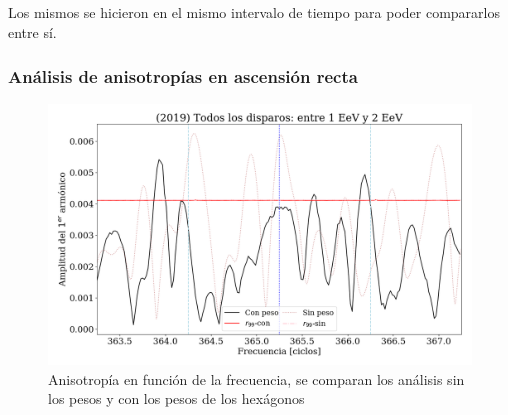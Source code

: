  Los mismos se hicieron en el mismo intervalo de tiempo para poder compararlos entre sí. 
 








	\subsubsection{Análisis de anisotropías en ascensión recta}
		
		\begin{figure}[H]
			\centering
			\includegraphics[width=0.75\linewidth]{pesos_sin_con_1_2_EeV.png}
			\caption{Anisotropía en función de la frecuencia, se comparan los análisis sin los pesos y con los pesos de los hexágonos}
		\end{figure}
		

